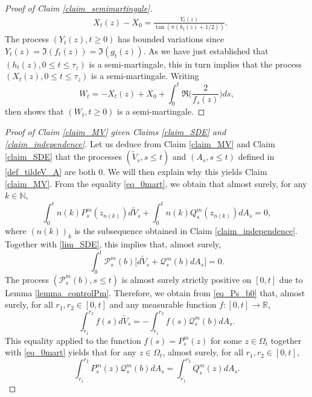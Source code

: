 \documentclass{article}
\theoremstyle{definition}
\theoremstyle{remark}
\theoremstyle{remark}
\begin{document}
\begin{proof}[Proof of Claim \ref{claim_semimartingale}]
\begin{align*}
    & X_t(z) - X_0 = \frac{Y_t(z)}{\tan(\pi(h_t(z)+1/2))}.
\end{align*}
The process $(Y_t(z), t \geq 0)$ has bounded variations since $Y_t(z)=\Im(f_t(z))=\Im(g_t(z))$. As we have just established that $(h_t(z), 0 \leq t \leq \tau_z)$ is a semi-martingale, this in turn implies that the process $(X_t(z), 0 \leq t \leq \tau_z)$ is a semi-martingale. Writing
\begin{equation*}
    W_t = -X_t(z) + X_0 + \int_{0}^{t} \Re \bigg( \frac{2}{f_s(z)}\bigg) ds,
\end{equation*}
then shows that $(W_t, t \geq 0)$ is a semi-martingale.
\end{proof}

\begin{proof}[Proof of Claim \ref{claim_MV} given Claims \ref{claim_SDE} and \ref{claim_independence}]
Let us deduce from Claim \ref{claim_MV} and Claim \ref{claim_SDE} that the processes $(\tilde V_s, s \leq t)$ and $(A_s, s \leq t)$ defined in \eqref{def_tildeV_A} are both $0$. We will then explain why this yields Claim \ref{claim_MV}. From the equality \eqref{eq_0mart}, we obtain that almost surely, for any $k \in \mathbb{N}$,
\begin{equation*}
    \int_{0}^{t} n(k) P_s^m(z_{n(k)}) d \tilde V_s + \int_{0}^{t} n(k)Q_s^m(z_{n(k)}) dA_s = 0,
\end{equation*}
where $(n(k))_k$ is the subsequence obtained in Claim \ref{claim_independence}. Together with \eqref{lim_SDE}, this implies that, almost surely,
\begin{equation} \label{eq_Ps_b0}
    \int_{0}^{t} \mathcal{P}_s^{m}(b)\big[d\tilde V_s +\mathcal{Q}_{s}^{m}(b)dA_s \big] = 0.
\end{equation}
The process $(\mathcal{P}_s^{m}(b), s \leq t)$ is almost surely strictly positive on $[0,t]$ due to Lemma \ref{lemma_controlPm}. Therefore, we obtain from \eqref{eq_Ps_b0} that, almost surely, for all $r_1, r_2 \in [0,t]$ and any measurable function $f: [0,t] \to \mathbb{R}$,
\begin{equation} \label{eq_Vs_As}
    \int_{r_1}^{r_2} f(s) d \tilde V_s = - \int_{r_1}^{r_2} f(s) \mathcal{Q}_s^{m}(b) dA_s.
\end{equation}
This equality applied to the function $f(s) = P_s^m(z)$ for some $z \in \Omega_t$ together with \eqref{eq_0mart} yields that for any $z \in \Omega_t$, almost surely, for all $r_1, r_2 \in [0,t]$,
\begin{equation*}
    \int_{r_1}^{r_2} P_s^m(z) \mathcal{Q}_{s}^{m}(b)dA_s = \int_{r_1}^{r_2} Q_s^m(z) dA_s.

\end{equation*}
\end{proof}
\end{document}

